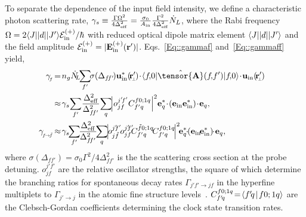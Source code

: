 \documentclass[aps,pra,twocolumn]{revtex4-1} %
\newcommand{\inp}{{\rm in}}
\begin{document}
\begin{appendix}
To separate the dependence of the input field intensity, we define a characteristic photon scattering rate, $\gamma_s \equiv \frac{\Gamma\Omega^2}{4\Delta_{\rm eff}^2}= \frac{\sigma_0}{A_{\rm in}}\frac{\Gamma^2}{4 \Delta_\eff^2} \dot{N}_L $, where the Rabi frequency $ \Omega=2\bra{J}|d|\ket{J'}\mathcal{E}^{(+)}_{\rm in}/\hbar $ with reduced optical dipole matrix element $\bra{J}|d|\ket{J'}$ and the field amplitude $ \mathcal{E}^{(+)}_{\rm in}=|\mathbf{E}_{\rm in}^{(+)}(\br')| $.
Eqs.~\eqref{Eq::gammaf} and~\eqref{Eq::gammaff} yield,
	\begin{align}
		\!\!\!\!\!\!\!\!\!\!\!\!\!\!\!\!\!\!\!\!\!\!\!\!\!\gamma\!_{_f} &\!=\!n_g\dot{N}\!\!_L  \!\!\sum_{f'}\!\! \sigma (\Delta_{f\!f'} \!) \mathbf{u}^*_\inp(\!\br'\!\!\!_{_\perp}\!)\!\cdot\! \bra{f\!,\!0} \hat{\tensor{\mbf{A}}}(f\!,\!f') \ket{f\!,\!0} \! \cdot\! \mathbf{u}_\inp(\!\br'\!\!\!_{_\perp}\!)\\
		&\!\approx\!  \gamma_s\! \sum_{f'}\! \frac{\Delta_{\rm eff}^2}{\Delta_{f\!f'}^2}\!\sum_q\!\! \left| o_{jf}^{j'\!f'}C_{f'q}^{f0;1 q}\right|^2\! \mathbf{e}_q^* \!\cdot\! (\mathbf{e}_{\rm in}\mathbf{e}_{\rm in}^* )\!\cdot\! \mathbf{e}_q, \\
		\!\!\!\!\!\gamma\!_{_{f \!\rightarrow\! \tilde{f}}} 
		&\!\approx\! \gamma_s \!\!\sum_{f'}\!\! \frac{\Delta_{\rm eff}^2}{\Delta_{f\!f'}^2}\!\!\sum_q\!\! \left|\! o_{j\tilde{f}}^{j'\!\!f'}\! o_{jf}^{j'\!\!f'}\!\!C_{f'q}^{\tilde{f}0;1 q} \!C_{f'q}^{f0;1q} \!\right|^2 \!\! \mathbf{e}_q^* \!\!\cdot\!\! (\mathbf{e}_{\rm in}\!\mathbf{e}_{\rm in}^* )\!\!\cdot\! \mathbf{e}_q,
	\end{align}
where $ \sigma (\Delta_{f\!f'} ) \! =\! \sigma_0 \Gamma^2\!/\!4\Delta^2_{f\!f'}$ is the the scattering cross section at the probe detuning. 
$ o_{jf}^{j'\!\!f'} $ are the relative oscillator strengths, the square of which determine the branching ratios for spontaneous decay rates $ \Gamma_{j'\!f'\!\rightarrow\! j\!f} $ in the hyperfine multiplets to $\Gamma\!_{j'\!\rightarrow\! j}  $ in the atomic fine structure levels~\cite{deutsch_quantum_2010}. 
$ C_{f'\!q}^{f0;1 q}\!=\!\Braket{f'\!q}{f0;1q} $ are the Clebsch-Gordan coefficients determining the clock state transition rates.



\end{appendix}
\end{document}
